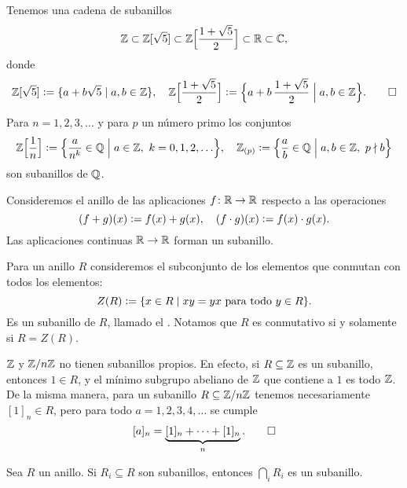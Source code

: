 \begin{ejemplo}
  Tenemos una cadena de subanillos
  \[ \mathbb{Z} \subset \mathbb{Z} [\sqrt{5}] \subset
     \mathbb{Z} \Bigl[\frac{1 + \sqrt{5}}{2}\Bigr] \subset \mathbb{R} \subset \mathbb{C}, \]
    donde
    \[ \mathbb{Z} [\sqrt{5}] \mathrel{\mathop:}= \{ a + b\sqrt{5} \mid a,b\in \mathbb{Z} \},
       \quad
       \mathbb{Z} \Bigl[\frac{1 + \sqrt{5}}{2}\Bigr] \mathrel{\mathop:}=
       \Bigl\{ a + b\,\frac{1 + \sqrt{5}}{2} \Bigm| a,b\in \mathbb{Z} \Bigr\}. \qedhere \]
\end{ejemplo}

\begin{ejemplo}
  Para $n = 1,2,3,\ldots$ y para $p$ un número primo los conjuntos
  \[ \mathbb{Z} \Bigl[\frac{1}{n}\Bigr] \mathrel{\mathop:}=
     \Bigl\{ \frac{a}{n^k} \in \mathbb{Q} \Bigm| a\in \mathbb{Z}, ~ k = 0,1,2,\ldots \Bigr\},
     \quad
     \mathbb{Z}_{(p)} \mathrel{\mathop:}=
     \Bigl\{ \frac{a}{b} \in \mathbb{Q} \Bigm| a,b\in \mathbb{Z}, ~ p\nmid b \Bigr\} \]
  son subanillos de $\mathbb{Q}$.
\end{ejemplo}

\begin{ejemplo}
  Consideremos el anillo de las aplicaciones $f\colon \mathbb{R}\to\mathbb{R}$ respecto a las
  operaciones 
  \[ (f + g) (x) \mathrel{\mathop:}= f (x) + g (x), \quad
     (f\cdot g) (x) \mathrel{\mathop:}= f (x)\cdot g (x). \]
  Las aplicaciones continuas $\mathbb{R} \to \mathbb{R}$ forman un subanillo.
\end{ejemplo}

\begin{ejemplo}
  Para un anillo $R$ consideremos el subconjunto de los elementos que conmutan
  con todos los elementos:
  $$Z (R) \mathrel{\mathop:}= \{ x\in R \mid xy = yx \text{ para todo }y\in R \}.$$
  Es un subanillo de $R$, llamado el
  . Notamos que $R$ es conmutativo si y
  solamente si $R = Z (R)$.
\end{ejemplo}

\begin{ejemplo}
  $\mathbb{Z}$ y $\mathbb{Z}/n\mathbb{Z}$ no tienen subanillos propios. En efecto,
  si $R \subseteq \mathbb{Z}$ es un subanillo, entonces $1 \in R$, y el mínimo subgrupo
  abeliano de $\mathbb{Z}$ que contiene a $1$ es todo $\mathbb{Z}$. De la misma manera, para
  un subanillo $R \subseteq \mathbb{Z}/n\mathbb{Z}$ tenemos necesariamente $[1]_n \in R$, pero
  para todo $a = 1,2,3,4,\ldots$ se cumple
  \[ [a]_n = \underbrace{[1]_n + \cdots + [1]_n}_n. \qedhere \]
\end{ejemplo}

\begin{observacion}
  Sea $R$ un anillo. Si $R_i \subseteq R$ son subanillos, entonces
  $\bigcap_i R_i$ es un subanillo.
\end{observacion}


